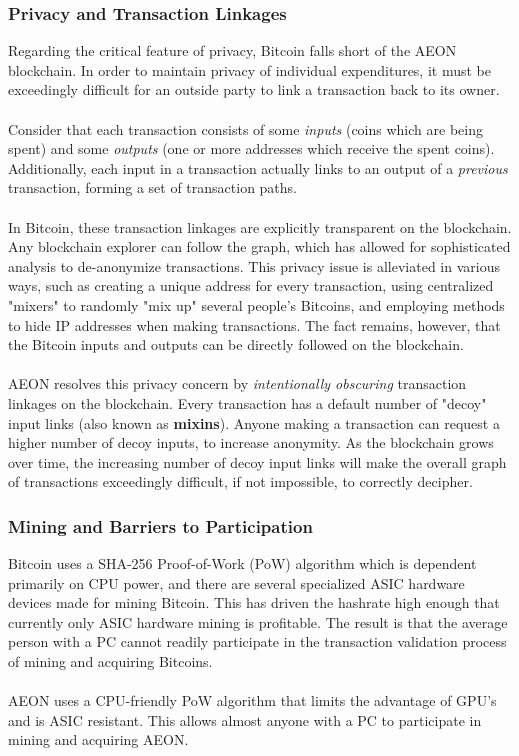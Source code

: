 \subsubsection{Privacy and Transaction Linkages}
Regarding the critical feature of privacy, Bitcoin falls short of the AEON blockchain. In order to maintain privacy of individual expenditures, it must be exceedingly difficult for an outside party to link a transaction back to its owner.\\
\\
Consider that each transaction consists of some \textit{inputs} (coins which are being spent) and some \textit{outputs} (one or more addresses which receive the spent coins).  Additionally, each input in a transaction actually links to an output of a \textit{previous} transaction, forming a set of transaction paths.\\
\\
In Bitcoin, these transaction linkages are explicitly transparent on the blockchain. Any blockchain explorer can follow the graph, which has allowed for sophisticated analysis to de-anonymize transactions. This privacy issue is alleviated in various ways, such as creating a unique address for every transaction, using centralized "mixers" to randomly "mix up" several people's Bitcoins, and employing methods to hide IP addresses when making transactions.  The fact remains, however, that the Bitcoin inputs and outputs can be directly followed on the blockchain.\\
\\
AEON resolves this privacy concern by \textit{intentionally obscuring} transaction linkages on the blockchain. Every transaction has a default number of "decoy" input links (also known as \textbf{mixins}). Anyone making a transaction can request a higher number of decoy inputs, to increase anonymity.  As the blockchain grows over time, the increasing number of decoy input links will make the overall graph of transactions exceedingly difficult, if not impossible, to correctly decipher.

\subsubsection{Mining and Barriers to Participation}
Bitcoin uses a SHA-256 Proof-of-Work (PoW) algorithm which is dependent primarily on CPU power, and there are several specialized ASIC hardware devices made for mining Bitcoin. This has driven the hashrate high enough that currently only ASIC hardware mining is profitable.  The result is that the average person with a PC cannot readily participate in the transaction validation process of mining and acquiring Bitcoins.\\
\\
AEON uses a CPU-friendly PoW algorithm that limits the advantage of GPU’s and is ASIC resistant. This allows almost anyone with a PC to participate in mining and acquiring AEON. 


